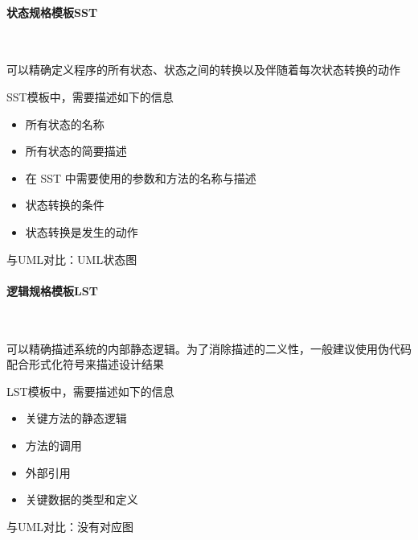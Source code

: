 \paragraph{状态规格模板SST}~{} \par
可以精确定义程序的所有状态、状态之间的转换以及伴随着每次状态转换的动作

SST模板中，需要描述如下的信息
\vspace{-0.8em}
\begin{multicols}{3}
    \begin{itemize}
        \item 所有状态的名称
        \item 所有状态的简要描述
        \item 在 SST 中需要使用的参数和方法的名称与描述
        \item 状态转换的条件
        \item 状态转换是发生的动作
    \end{itemize}
\end{multicols}
\vspace{-1em}

与UML对比：UML状态图

\paragraph{逻辑规格模板LST}~{} \par
可以精确描述系统的内部静态逻辑。为了消除描述的二义性，一般建议使用伪代码配合形式化符号来描述设计结果

LST模板中，需要描述如下的信息
\vspace{-0.8em}
\begin{multicols}{2}
    \begin{itemize}
        \item 关键方法的静态逻辑
        \item 方法的调用
        \item 外部引用
        \item 关键数据的类型和定义
    \end{itemize}
\end{multicols}
\vspace{-1em}

与UML对比：没有对应图

